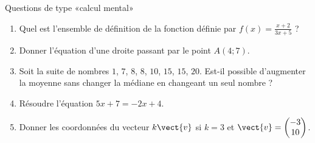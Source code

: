
\begin{exercice}\label{exosmath-0714}

    Questions de type «calcul mental» 
    \begin{multicols}{2}
    \begin{enumerate}
        \item
            Quel est l'ensemble de définition de la fonction définie par \( f(x)=\frac{ x+2 }{ 3x+5 }\) ?
        \item
            Donner l'équation d'une droite passant par le point \( A(4;7)\).
        \item
            Soit la suite de nombres \( 1\), \( 7\), \( 8\), \( 8\), \( 10\), \( 15\), \( 15\), \( 20\). Est-il possible d'augmenter la moyenne sans changer la médiane en changeant un seul nombre ?
        \item
            Résoudre l'équation \( 5x+7=-2x+4\).
        \item
            Donner les coordonnées du vecteur \( k\vect{ v }\) si \( k=3\) et \( \vect{ v }=\begin{pmatrix}
                -3    \\ 
                10    
            \end{pmatrix}\).
    \end{enumerate}
    \end{multicols}

\end{exercice}
